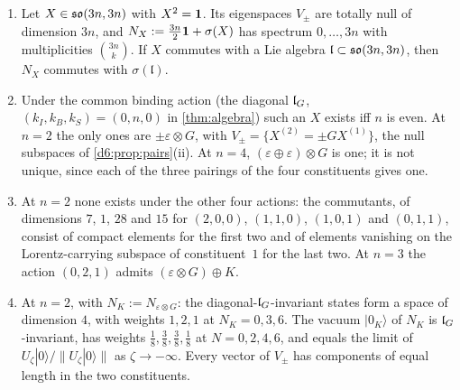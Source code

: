 \begin{theorem}
\label{e2:thm:invnumber}
\begin{enumerate}[label=(\roman*),leftmargin=2.2em]
\item Let $X\in\mathfrak{so}(3n,3n)$ with $X^2=\mathbf 1$. Its eigenspaces $V_\pm$ are totally null of dimension $3n$, and $N_X:=\tfrac{3n}2\mathbf 1+\sigma(X)$ has spectrum
$0,\dots,3n$ with multiplicities $\binom{3n}k$. If $X$ commutes with a Lie algebra $\mathfrak l\subset\mathfrak{so}(3n,3n)$, then $N_X$ commutes with $\sigma(\mathfrak l)$.
\item Under the common binding action (the diagonal $\mathfrak l_G$, $(k_I,k_B,k_S)=(0,n,0)$ in \cref{thm:algebra}) such an $X$ exists iff $n$ is even.
At $n=2$ the only ones are $\pm\varepsilon\otimes G$, with $V_\pm=\{X^{(2)}=\pm GX^{(1)}\}$, the null subspaces of \cref{d6:prop:pairs}(ii). At
$n=4$, $(\varepsilon\oplus\varepsilon)\otimes G$ is one; it is not unique, since each of the three pairings of the four constituents gives one.
\item At $n=2$ none exists under the other four actions: the commutants, of dimensions $7$, $1$, $28$ and $15$ for $(2,0,0)$, $(1,1,0)$, $(1,0,1)$ and
$(0,1,1)$, consist of compact elements for the first two and of elements vanishing on the Lorentz-carrying subspace of constituent~$1$ for the
last two. At $n=3$ the action $(0,2,1)$ admits $(\varepsilon\otimes G)\oplus K$.
\item At $n=2$, with $N_K:=N_{\varepsilon\otimes G}$: the diagonal-$\mathfrak l_G$-invariant states form a space of dimension $4$, with weights $1,2,1$ at
$N_K=0,3,6$. The vacuum $|0_K\rangle$ of $N_K$ is $\mathfrak l_G$-invariant, has weights $\tfrac18,\tfrac38,\tfrac38,\tfrac18$ at $N=0,2,4,6$, and equals the
limit of $U_\zeta|0\rangle/\|U_\zeta|0\rangle\|$ as $\zeta\to-\infty$. Every vector of $V_\pm$ has components of equal length in the two constituents.
\end{enumerate}
\end{theorem}

